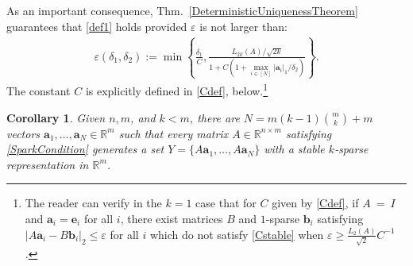 \documentclass[journal, twocolumn]{IEEEtran}
\newtheorem{corollary}{Corollary}
\newtheorem{remark}{Remark}
\begin{document}

As an important consequence, Thm.~\ref{DeterministicUniquenessTheorem} guarantees that \eqref{def1} holds provided $\varepsilon$ is not larger than:
\begin{align*}
\varepsilon(\delta_1, \delta_2) := \min \left\{ \frac{\delta_1}{ C }, \frac{ L_{2k}(A) / \sqrt{2k}}{1 + C\left(1 + \max_{i \in [N]} |\mathbf{a}_i|_1 / \delta_2 \right)} \right\}.
\end{align*}
%
The constant $C$ is explicitly defined in \eqref{Cdef}, below.\footnote{The reader can verify in the $k=1$ case that for $C$ given by \eqref{Cdef}, if \mbox{$A$ = $I$} and $\mathbf{a}_i = \mathbf{e}_i$ for all $i$, there exist matrices $B$ and $1$-sparse $\mathbf{b}_i$ satisfying $|A\mathbf{a}_i - B\mathbf{b}_i|_2 \leq \varepsilon$ for all $i$ which do not satisfy \eqref{Cstable} when $\varepsilon \geq \frac{L_2(A)}{\sqrt{2}}C^{-1}$.} 

\begin{corollary}\label{DeterministicUniquenessCorollary}
Given $n, m$, and $k < m$, there are $N =  m(k-1){m \choose k}+m$ vectors \mbox{$\mathbf{a}_1, \ldots, \mathbf{a}_N \in \mathbb{R}^m$} such that every matrix $A \in \mathbb{R}^{n \times m}$ satisfying \eqref{SparkCondition} generates a set $Y = \{A\mathbf{a}_1, \ldots, A\mathbf{a}_N\}$ with a stable $k$-sparse representation in $\mathbb R^m$.
\end{corollary}
\end{document}
